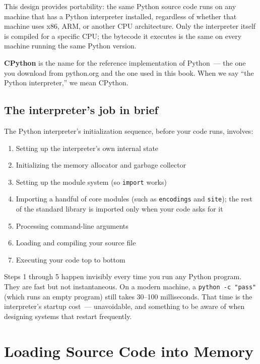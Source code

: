 \noindent{}This design provides portability: the same Python source code runs on any machine that has a Python interpreter installed, regardless of whether that machine uses x86, ARM, or another CPU architecture. Only the interpreter itself is compiled for a specific CPU; the bytecode it executes is the same on every machine running the same Python version.

\textbf{CPython} is the name for the reference implementation of Python~--- the one you download from python.org and the one used in this book. When we say ``the Python interpreter,'' we mean CPython.

\subsection*{The interpreter's job in brief}\label{02-runtime-initialization:the-interpreters-job-in-brief}

The Python interpreter's initialization sequence, before your code runs, involves:

\begin{enumerate}
\def\labelenumi{\arabic{enumi}.}
\tightlist
\item
  Setting up the interpreter's own internal state
\item
  Initializing the memory allocator and garbage collector
\item
  Setting up the module system (so \texttt{import} works)
\item
  Importing a handful of core modules (such as \texttt{encodings} and \texttt{site}); the rest of the standard library is imported only when your code asks for it
\item
  Processing command-line arguments
\item
  Loading and compiling your source file
\item
  Executing your code top to bottom
\end{enumerate}

\noindent{}Steps 1 through 5 happen invisibly every time you run any Python program. They are fast but not instantaneous. On a modern machine, a \texttt{python\ -c\ "pass"} (which runs an empty program) still takes 30--100 milliseconds. That time is the interpreter's startup cost~--- unavoidable, and something to be aware of when designing systems that restart frequently.

\setcounter{section}{1}
\section{Loading Source Code into Memory}\label{02-runtime-initialization:22-loading-source-code-into-memory}

